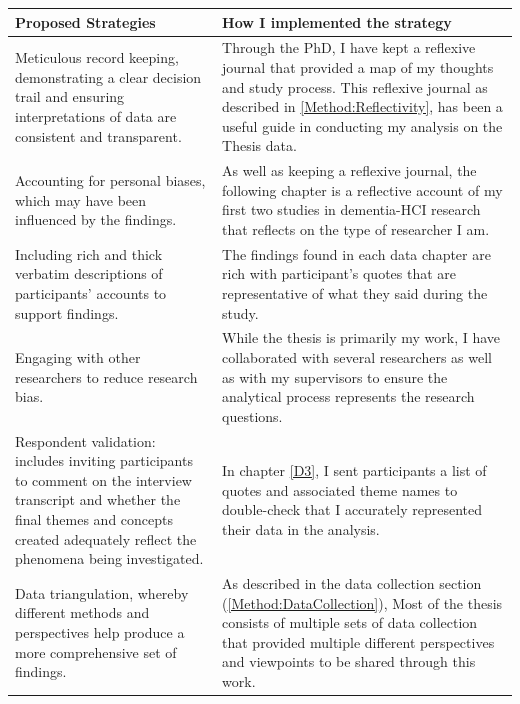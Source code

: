 \begin{center}
\begin{tabular}{ | m{17em} | m{17em}|  } 
  \hline
  \textbf{Proposed Strategies} & \textbf{How I implemented the strategy}  \\ 
  \hline
   Meticulous record keeping, demonstrating a clear decision trail and ensuring interpretations of data are consistent and transparent.
  &  Through the PhD, I have kept a reflexive journal that provided a map of my thoughts and study process. This reflexive journal as described in \ref{Method:Reflectivity}, has been a useful guide in conducting my analysis on the Thesis data.
 \\ 
 \hline
 Accounting for personal biases, which may have been influenced by the findings. 
  & As well as keeping a reflexive journal, the following chapter is a reflective account of my first two studies in dementia-HCI research that reflects on the type of researcher I am. \\ 
  \hline
   Including rich and thick verbatim descriptions of participants’ accounts to support findings.
  & The findings found in each data chapter are rich with participant's quotes that are representative of what they said during the study.  \\ 
  \hline
   Engaging with other researchers to reduce research bias.
  & While the thesis is primarily my work, I have collaborated with several researchers as well as with my supervisors to ensure the analytical process represents the research questions.  \\ 
  \hline
   Respondent validation: includes inviting participants to comment on the interview transcript and whether the final themes and concepts created adequately reflect the phenomena being investigated.
  & In chapter \ref{D3}, I sent participants a list of quotes and associated theme names to double-check that I accurately represented their data in the analysis. \\ 
  \hline
   Data triangulation, whereby different methods and perspectives help produce a more comprehensive set of findings.
  & As described in the data collection section (\ref{Method:DataCollection}), Most of the thesis consists of multiple sets of data collection that provided multiple different perspectives and viewpoints to be shared through this work.  \\ 
  \hline
  
\end{tabular}
\end{center}


